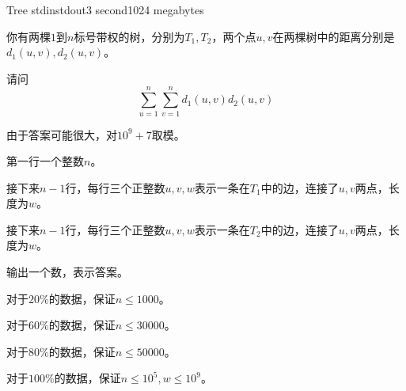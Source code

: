 \begin{problem}{Tree}
{stdin}{stdout}{3 second}{1024 megabytes}

你有两棵$1$到$n$标号带权的树，分别为$T_1, T_2$，两个点$u,v$在两棵树中的距离分别是$d_1(u,v), d_2(u,v)$。

请问$$\sum_{u=1}^n \sum_{v=1} ^n d_1(u,v) d_2(u,v)$$

由于答案可能很大，对$10^9+7$取模。

\Input

第一行一个整数$n$。

接下来$n-1$行，每行三个正整数$u,v,w$表示一条在$T_1$中的边，连接了$u,v$两点，长度为$w$。

接下来$n-1$行，每行三个正整数$u,v,w$表示一条在$T_2$中的边，连接了$u,v$两点，长度为$w$。


\Output

输出一个数，表示答案。
\Example
\begin{example}
\end{example}

\Constraints

对于$20 \%$的数据，保证$n \leq 1000$。

对于$60 \%$的数据，保证$n\leq 30000$。

对于$80 \%$的数据，保证$n \leq 50000$。

对于$100 \%$的数据，保证$n\leq 10^5, w\leq 10^9$。

\end{problem}